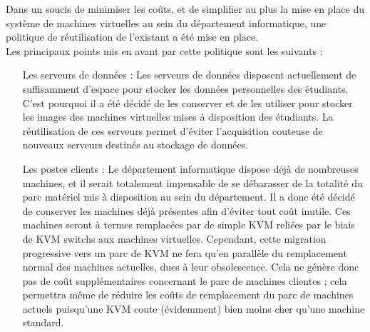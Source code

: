 Dans un soucis de minimiser les coûts, et de simplifier au plus la mise en place du système de machines virtuelles au sein du département informatique, une politique de réutilisation de l'existant a été mise en place.\\
Les principaux points mis en avant par cette politique sont les suivants :
\begin{itemize}
\item[Les serveurs de données] : Les serveurs de données disposent actuellement de suffisamment d'espace pour stocker les données personnelles des étudiants. C'est pourquoi il a été décidé de les conserver et de les utiliser pour stocker les images des machines virtuelles mises à disposition des étudiants. La réutilisation de ces serveurs permet d'éviter l'acquisition couteuse de nouveaux serveurs destinés au stockage de données.
\item [Les postes clients] : Le département informatique dispose déjà de nombreuses machines, et il serait totalement impensable de se débarasser de la totalité du parc matériel mis à disposition au sein du département. Il a donc été décidé de conserver les machines déjà présentes afin d'éviter tout coût inutile. Ces machines seront à termes remplacées par de simple KVM reliées par le biais de KVM switchs aux machines virtuelles. Cependant, cette migration progressive vers un parc de KVM ne fera qu'en parallèle du remplacement normal des machines actuelles, dues à leur obsolescence. Cela ne génère donc pas de coût supplémentaires concernant le parc de machines clientes ; cela permettra même de réduire les coûts de remplacement du parc de machines actuels puisqu'une KVM coute (évidemment) bien moins cher qu'une machine standard.

\end{itemize}

